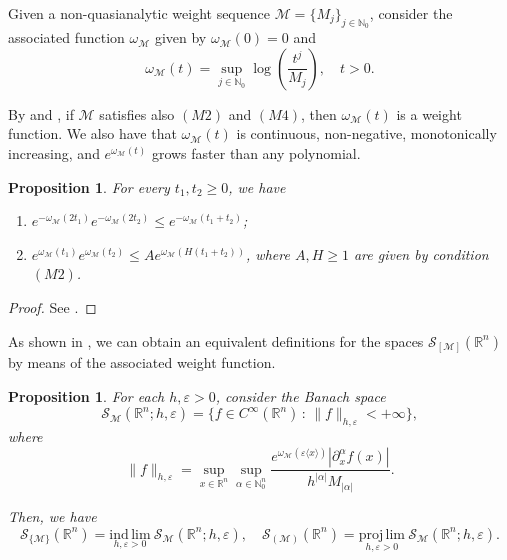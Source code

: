 \documentclass[11pt,reqno]{amsart}
\numberwithin{equation}{section}
\newtheorem{proposition}[theorem]{Proposition}
\newcommand{\R}{{\mathbb{R}}} %
\newcommand{\N}{{\mathbb{N}}} %
\newcommand{\Mj}{{\{M_j\}_{j\in\mathbb{N}_0}}} %
\newcommand{\M}{{\mathcal{M}}} %
\begin{document}
Given a non-quasianalytic weight sequence $\M=\Mj$, consider the associated function $\omega_\M$ given by $\omega_\M(0)=0$ and
%
\begin{equation}\label{weight_seq}
	\omega_\M(t) = \sup_{j\in\N_0}\log\left(\frac{t^j}{M_j}\right),\quad t>0.
\end{equation}


By \cite[Proposition 13]{BMM2007} and \cite[Lemma 5.5]{PV1984}, if $\M$ satisfies also $(M2)$ and $(M4)$, then $\omega_\M(t)$ is a weight function. We also have that $\omega_\M(t)$ is continuous, non-negative, monotonically increasing, and $e^{\omega_\M(t)}$ grows faster than any polynomial.


\begin{proposition}\label{prop_KMR}
	For every $t_1,t_2\geq 0$, we have
	\begin{enumerate}
		\item $e^{-\omega_\M(2t_1)}e^{-\omega_\M(2t_2)}\leq e^{-\omega_\M(t_1+t_2)}$;
		
		\item $e^{\omega_\M(t_1)}e^{\omega_\M(t_2)}\leq Ae^{\omega_\M(H(t_1+t_2))}$, where $A,H\geq 1$ are given by condition $(M2)$.
	\end{enumerate}
\end{proposition}
%
\begin{proof}
	See \cite[Proposition 1]{KMR_2022}. 
\end{proof}


As shown in \cite[Section 2.5]{CKP_book}, we can obtain an equivalent definitions for the spaces $\mathcal{S}_{[\M]}(\R^n)$ by means of the associated weight function.


\begin{proposition}\label{equiv_GS}
	For each $h,\varepsilon>0$, consider the Banach space
	\[\mathcal{S}_{\M}(\R^n;h,\varepsilon) = \{f\in C^\infty(\R^n)\,:\, \|f\|_{h,\varepsilon}<+\infty\},\]
	where
	\begin{equation}\label{GS_exp}\|f\|_{h,\varepsilon} = \sup_{x\in\R^n}\sup_{\alpha\in\N_0^n}\frac{e^{\omega_\M(\varepsilon\langle x\rangle)}|\partial_x^\alpha f(x)|}{h^{|\alpha|}M_{|\alpha|}}.\end{equation}
	
	Then, we have
	\[\mathcal{S}_{\{\M\}}(\R^n) = \underset{h,\varepsilon>0}{\mathrm{ind\,lim}}\ \mathcal{S}_{\M}(\R^n;h,\varepsilon),
	\quad
	\mathcal{S}_{(\M)}(\R^n) = \underset{h,\varepsilon>0}{\mathrm{proj\,lim}}\ \mathcal{S}_{\M}(\R^n;h,\varepsilon).\]
\end{proposition}
\end{document}
